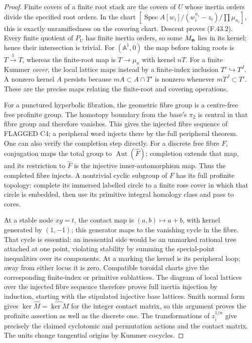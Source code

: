 \documentclass[11pt,oneside]{article}
\begin{document}
\begin{proof}
Finite covers of a finite root stack are the covers of $U$
whose inertia orders divide the specified root orders. In
the chart $[\operatorname{Spec}A[w_i]/(w_i^{n_i}-z_i)/
\prod\mu_{n_i}]$, this is exactly unramifiedness on the
covering chart. Descent proves (F.43.2). Every finite
quotient of $P_U$ has finite inertia orders, so some
$M_{\bf n}$ lies in its kernel; hence their intersection
is trivial. For $(\mathbb A^1,0)$ the map before taking
roots is $T\xrightarrow{1}T$, whereas the finite-root
map is $T\to\mu_n$ with kernel $nT$. For a finite Kummer
\emph{cover}, the local lattice maps instead by a finite-index
inclusion $T'\hookrightarrow T^J$. A nonzero kernel $A$
persists because $mA\subset A\cap T'$ is nonzero whenever
$mT^J\subset T'$. These are the precise maps relating
the finite-root and covering operations.

For a punctured hyperbolic fibration, the geometric fibre
group is a centre-free free profinite group. The homotopy
boundary from the base's $\pi_2$ is central in that fibre
group and therefore vanishes. This gives the injected
fibre sequence of FLAGGED C4; a peripheral word injects
there by the full peripheral theorem. One can also verify
the completion step directly. For a discrete free fibre
$F$, conjugation maps the total group to
$\operatorname{Aut}(\widehat F)$; completion extends that
map, and its restriction to $\widehat F$ is the injective
inner-automorphism map. Thus the completed fibre injects.
A nontrivial cyclic subgroup of $F$ has its full profinite
topology: complete its immersed labelled circle to a finite
rose cover in which that circle is embedded, then use its
primitive integral homology class and pass to cores.

At a stable node $xy=t$, the contact map is
$(a,b)\mapsto a+b$, with kernel generated by $(1,-1)$;
this generator maps to the vanishing cycle in the fibre.
That cycle is essential: an inessential side would be an
unmarked rational tree attached at one point, violating
stability by summing the special-point inequalities over
its components. At a marking the kernel is its peripheral
loop; away from either locus it is zero. Compatible
toroidal charts give the corresponding finite-index or
primitive sublattices. The diagram of local lattices over
the injected fibre sequence therefore proves full inertia
injection by induction, starting with the stipulated
injective base lattices. Smith normal form gives
$\ker\widehat M=\widehat{\ker M}$ for the integer contact
matrix, so this argument proves the profinite assertion
as well as the discrete one. The transformations of
$z_i^{1/n}$ give precisely the claimed cyclotomic and
permutation actions and the contact matrix. The units
change tangential origins by Kummer cocycles.


\end{proof}
\end{document}
